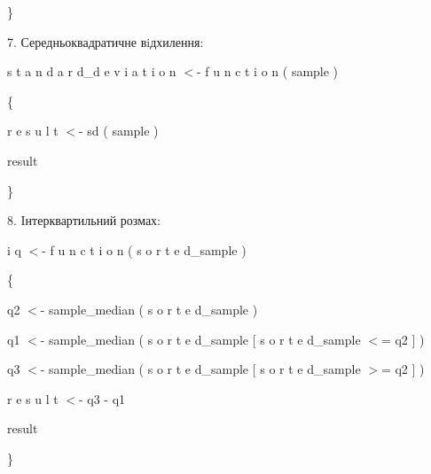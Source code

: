 \documentclass[a4paper,portrait,12pt]{article}
\begin{document}
\}





\begin{flushleft}
7. Середньоквадратичне вiдхилення:
\end{flushleft}


\begin{flushleft}
s t a n d a r d\_d e v i a t i o n $<$- f u n c t i o n ( sample )
\end{flushleft}


\{


\begin{flushleft}
r e s u l t $<$- sd ( sample )
\end{flushleft}


\begin{flushleft}
result
\end{flushleft}


\}





\begin{flushleft}
8. Iнтерквартильний розмах:
\end{flushleft}


\begin{flushleft}
i q $<$- f u n c t i o n ( s o r t e d\_sample )
\end{flushleft}


\{


\begin{flushleft}
q2 $<$- sample\_median ( s o r t e d\_sample )
\end{flushleft}


\begin{flushleft}
q1 $<$- sample\_median ( s o r t e d\_sample [ s o r t e d\_sample $<$= q2 ] )
\end{flushleft}


\begin{flushleft}
q3 $<$- sample\_median ( s o r t e d\_sample [ s o r t e d\_sample $>$= q2 ] )
\end{flushleft}


\begin{flushleft}
r e s u l t $<$- q3 - q1
\end{flushleft}


\begin{flushleft}
result
\end{flushleft}


\}
\end{document}
